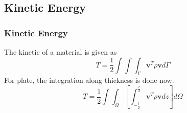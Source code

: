 \documentclass[9pt]{beamer}
\begin{document}
\subsection{Kinetic Energy}

\begin{frame}
\frametitle{Kinetic Energy}
The kinetic of a material is given as
\begin{equation*}
T = \frac{1}{2} \int \int \int_{\Gamma} \mathbf{v}^T\rho\mathbf{v} d\Gamma
\end{equation*}
For plate, the integration along thickness is done now.
\begin{equation*}
T = \frac{1}{2} \int \int_\Omega \left[ \int_{-\frac{t}{2}}^{\frac{t}{2}} \mathbf{v}^T\rho\mathbf{v} dz \right] d\Omega
\end{equation*}

\end{frame}
\end{document}
